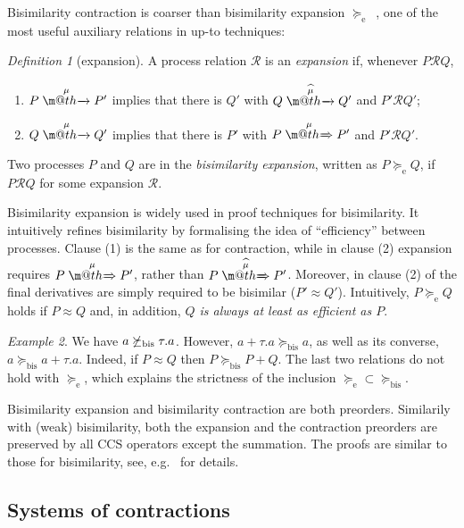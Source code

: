 \documentclass[GCNS]{yincog}
\makeatletter
\def \rightarrowfill{$\m@th\mathord{\smash-}\mkern-6mu%
  \cleaders\hbox{$\mkern-2mu\mathord{\smash-}\mkern-2mu$}\hfill
  \mkern-6mu\mathord\rightarrow$}
\def \rightarrowfillWEAK{$\m@th\mathord{\smash=}\mkern-6mu%
  \cleaders\hbox{$\mkern-2mu\mathord{\smash=}\mkern-2mu$}\hfill
  \mkern-6mu\mathord\Rightarrow$}
\theoremstyle{remark}
\newtheorem{definition}{Definition}[section]
\theoremstyle{theorem}
\theoremstyle{remark}
\newtheorem{example}[definition]{Example}
\newcommand{\arr}[1]{\mathrel{\stackrel{{\;\;#1\;\;}}{\mbox{\rightarrowfill}}}}
\newcommand{\Arr}[1]{\mathrel{\stackrel{{\;\;#1\;\;}}{\mbox{\rightarrowfillWEAK}}}}
\newcommand{\arcap}[1]{\mathrel{\stackrel{{\;\; {\widehat{#1}} \;\;}}{\mbox{\rightarrowfill}}}}
\newcommand{\Arcap}[1]{\mathrel{\stackrel{{\;\;{\widehat{#1}}\;\;}}{\mbox{\rightarrowfillWEAK}}}}
\def\Rvtex{\mathcal{R}}
\def\RRvtex{\mathrel{\mathcal{R}}}
\newcommand{\wbvtex}{\approx}
\newcommand{\expa}{\mathrel{\succeq_{\mathrm{e}}}}
\newcommand{\mcontrBIS}{\mathrel{\succeq_{\mathrm{bis}}}}
\makeatother
\begin{document}
Bisimilarity contraction is coarser than bisimilarity expansion
$\expa $~\cite{arun1992efficiency,sangiorgi2015equations}, one of the most
useful auxiliary relations in up-to techniques:
%
\begin{definition}[expansion]
 \label{d:expa}
A process relation ${\Rvtex}$ is an \emph{expansion} if, whenever
$P\RRvtex Q$,
%
\begin{enumerate}
%
\item $P \arr\mu P'$ implies that there is $Q'$ with
$Q \arcap \mu Q'$ and $P' \RRvtex Q'$;
%
\item $Q \arr\mu Q'$ implies that there is $P'$ with $P \Arr \mu P'$ and
$P' \RRvtex Q'$.
%
\end{enumerate}
%
Two processes $P$ and $Q$ are in the \emph{bisimilarity expansion}, written
as $P \expa Q$, if $P \RRvtex Q$ for some expansion $\Rvtex $.
\end{definition}
%
Bisimilarity expansion is widely used in proof techniques for bisimilarity.
It intuitively refines bisimilarity by formalising the idea of ``efficiency''
between processes. Clause (1) is the same as for contraction, while in
clause (2) expansion requires $P \Arr \mu P'$, rather than
$P \Arcap \mu P'$. Moreover, in clause (2) of  the final
derivatives are simply required to be bisimilar ($P' \wbvtex Q'$). Intuitively,
$P \expa Q$ holds if $P\wbvtex Q$ and, in addition,
\emph{$Q$ is always at least as efficient as $P$}.

\begin{example}
 \label{exa:contr}
We have $ a \not \mcontrBIS \tau . a$. However,
$a+ \tau . a \mcontrBIS a$, as well as its converse,
$ a \mcontrBIS a + \tau . a $. Indeed, if $P \wbvtex Q$ then
$ P \mcontrBIS P +Q$. The last two relations do not hold with
$\expa $, which explains the strictness of the inclusion
${\expa} \subset {\mcontrBIS}$.
\end{example}

Bisimilarity expansion and bisimilarity contraction are both preorders.
Similarily with (weak) bisimilarity, both the expansion and the contraction
preorders are preserved by all CCS operators except the summation. The
proofs are similar to those for bisimilarity, see, e.g.~\cite{sangiorgi2017equations}
for details.

\subsection{Systems of contractions}
 \label{ss:SysContr}
\end{document}
